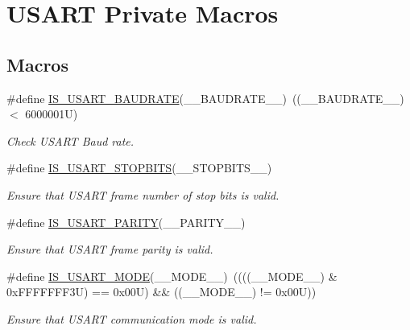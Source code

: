 \hypertarget{group___u_s_a_r_t___private___macros}{}\section{U\+S\+A\+RT Private Macros}
\label{group___u_s_a_r_t___private___macros}
\subsection*{Macros}
\begin{DoxyCompactItemize}
\item 
\#define \hyperlink{group___u_s_a_r_t___private___macros_gad6548de2566d9aeb45458fa915f6d509}{I\+S\+\_\+\+U\+S\+A\+R\+T\+\_\+\+B\+A\+U\+D\+R\+A\+TE}(\+\_\+\+\_\+\+B\+A\+U\+D\+R\+A\+T\+E\+\_\+\+\_\+)~((\+\_\+\+\_\+\+B\+A\+U\+D\+R\+A\+T\+E\+\_\+\+\_\+) $<$ 6000001\+U)
\begin{DoxyCompactList}\small\item\em Check U\+S\+A\+RT Baud rate. \end{DoxyCompactList}\item 
\#define \hyperlink{group___u_s_a_r_t___private___macros_ga7a724f758480c009bc3e591d12fd0343}{I\+S\+\_\+\+U\+S\+A\+R\+T\+\_\+\+S\+T\+O\+P\+B\+I\+TS}(\+\_\+\+\_\+\+S\+T\+O\+P\+B\+I\+T\+S\+\_\+\+\_\+)
\begin{DoxyCompactList}\small\item\em Ensure that U\+S\+A\+RT frame number of stop bits is valid. \end{DoxyCompactList}\item 
\#define \hyperlink{group___u_s_a_r_t___private___macros_gadf7f983b8108bdd3fafb9e299d72a5cf}{I\+S\+\_\+\+U\+S\+A\+R\+T\+\_\+\+P\+A\+R\+I\+TY}(\+\_\+\+\_\+\+P\+A\+R\+I\+T\+Y\+\_\+\+\_\+)
\begin{DoxyCompactList}\small\item\em Ensure that U\+S\+A\+RT frame parity is valid. \end{DoxyCompactList}\item 
\#define \hyperlink{group___u_s_a_r_t___private___macros_ga1ce858404f8b2b6befe4b920cc20e5c9}{I\+S\+\_\+\+U\+S\+A\+R\+T\+\_\+\+M\+O\+DE}(\+\_\+\+\_\+\+M\+O\+D\+E\+\_\+\+\_\+)~((((\+\_\+\+\_\+\+M\+O\+D\+E\+\_\+\+\_\+) \& 0x\+F\+F\+F\+F\+F\+F\+F3\+U) == 0x00\+U) \&\& ((\+\_\+\+\_\+\+M\+O\+D\+E\+\_\+\+\_\+) != 0x00\+U))
\begin{DoxyCompactList}\small\item\em Ensure that U\+S\+A\+RT communication mode is valid. \end{DoxyCompactList}\item 

\end{DoxyCompactItemize}
